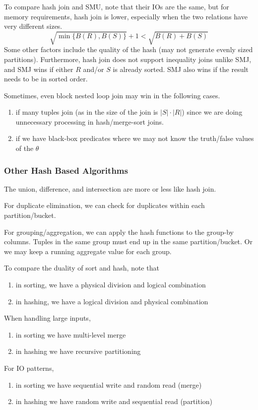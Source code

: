     \begin{theorem}
      To compare hash join and SMU, note that their IOs are the same, but for memory requirements, hash join is lower, especially when the two relations have very different sizes. 
      \begin{equation}
        \sqrt{\min\{B(R), B(S)\}} + 1 < \sqrt{B(R) + B(S)}
      \end{equation}
      Some other factors include the quality of the hash (may not generate evenly sized partitions). Furthermore, hash join does not support inequality joins unlike SMJ, and SMJ wins if either $R$ and/or $S$ is already sorted. SMJ also wins if the result needs to be in sorted order. 
    \end{theorem}

    Sometimes, even block nested loop join may win in the following cases. 
    \begin{enumerate}
      \item if many tuples join (as in the size of the join is $|S| \cdot |R|$) since we are doing unnecessary processing in hash/merge-sort joins. 
      \item if we have black-box predicates where we may not know the truth/false values of the $\theta$
    \end{enumerate}

  \subsubsection{Other Hash Based Algorithms}

    The union, difference, and intersection are more or less like hash join. 

    For duplicate elimination, we can check for duplicates within each partition/bucket. 

    For grouping/aggregation, we can apply the hash functions to the group-by columns. Tuples in the same group must end up in the same partition/bucket. Or we may keep a running aggregate value for each group. 

    To compare the duality of sort and hash, note that 
    \begin{enumerate}
      \item in sorting, we have a physical division and logical combination 
      \item in hashing, we have a logical division and physical combination
    \end{enumerate}
    When handling large inputs, 
    \begin{enumerate}
      \item in sorting we have multi-level merge 
      \item in hashing we have recursive partitioning 
    \end{enumerate}
    For IO patterns, 
    \begin{enumerate}
      \item in sorting we have sequential write and random read (merge) 
      \item in hashing we have random write and sequential read (partition) 
    \end{enumerate}

